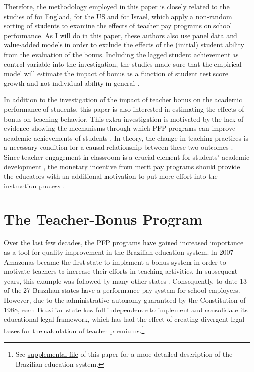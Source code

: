 \documentclass[a4paper, 12pt]{article}
\begin{document}
Therefore, the methodology employed in this paper is closely related to the studies of \citet{britton2016teacher} for England, \citet{imberman2015incentive} for the US and \citet{lavy2009performance} for Israel, which apply a non-random sorting of students to examine the effects of teacher pay programs on school performance. As I will do in this paper, these authors also use panel data and value-added models in order to exclude the effects of the (initial) student ability from the evaluation of the bonus. Including the lagged student achievement as control variable into the investigation, the studies made sure that the empirical model will estimate the impact of bonus as a function of student test score growth and not individual ability in general \citep{hanushek2012distribution}.



In addition to the investigation of the impact of teacher bonus on the academic performance of students, this paper is also interested in estimating the effects of bonus on teaching behavior. This extra investigation is motivated by the lack of evidence showing the mechanisms through which PFP programs can improve academic achievements of students \citep{nyberg2018collective, hanushek2011overview}. In theory, the change in teaching practices is a necessary condition for a causal relationship between these two outcomes \citep{jones2013teacher}. Since teacher engagement in classroom is a crucial element for students’ academic development \citep{woessmann2011cross}, the monetary incentive from merit pay programs should provide the educators with an additional motivation to put more effort into the instruction process \citep{gneezy2011and}. 






\section{The Teacher-Bonus Program} \label{Paper3-Bonus}


Over the last few decades, the PFP programs have gained increased importance as a tool for quality improvement in the Brazilian education system. In 2007 Amazonas became the first state to implement a bonus system in order to motivate teachers to increase their efforts in teaching activities. In subsequent years, this example was followed by many other states \citep{scorzafave2016efeito}. Consequently, to date 13 of the 27 Brazilian states have a performance-pay system for school employees. However, due to the administrative autonomy guaranteed by the Constitution of 1988, each Brazilian state has full independence to implement and consolidate its educational-legal framework, which has had the effect of creating divergent legal bases for the calculation of teacher premiums.\footnote{See \hyperref[SuppMaterial]{supplemental file} of this paper for a more detailed description of the Brazilian education system.}
\end{document}
